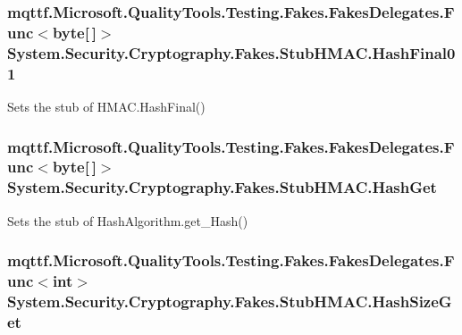 \hypertarget{class_system_1_1_security_1_1_cryptography_1_1_fakes_1_1_stub_h_m_a_c_adf1b2e12b0d5e1285e25241c6e3b28b3}{
\subsubsection[{Hash\-Final01}]{\setlength{\rightskip}{0pt plus 5cm}mqttf.\-Microsoft.\-Quality\-Tools.\-Testing.\-Fakes.\-Fakes\-Delegates.\-Func$<$byte\mbox{[}$\,$\mbox{]}$>$ System.\-Security.\-Cryptography.\-Fakes.\-Stub\-H\-M\-A\-C.\-Hash\-Final01}}\label{class_system_1_1_security_1_1_cryptography_1_1_fakes_1_1_stub_h_m_a_c_adf1b2e12b0d5e1285e25241c6e3b28b3}


Sets the stub of H\-M\-A\-C.\-Hash\-Final()

\hypertarget{class_system_1_1_security_1_1_cryptography_1_1_fakes_1_1_stub_h_m_a_c_aa15cb8a04dc40f3ab59d8beb2ae68a93}{
\subsubsection[{Hash\-Get}]{\setlength{\rightskip}{0pt plus 5cm}mqttf.\-Microsoft.\-Quality\-Tools.\-Testing.\-Fakes.\-Fakes\-Delegates.\-Func$<$byte\mbox{[}$\,$\mbox{]}$>$ System.\-Security.\-Cryptography.\-Fakes.\-Stub\-H\-M\-A\-C.\-Hash\-Get}}\label{class_system_1_1_security_1_1_cryptography_1_1_fakes_1_1_stub_h_m_a_c_aa15cb8a04dc40f3ab59d8beb2ae68a93}


Sets the stub of Hash\-Algorithm.\-get\-\_\-\-Hash()

\hypertarget{class_system_1_1_security_1_1_cryptography_1_1_fakes_1_1_stub_h_m_a_c_ad02589267222c5333b54b43fd5ccd565}{
\subsubsection[{Hash\-Size\-Get}]{\setlength{\rightskip}{0pt plus 5cm}mqttf.\-Microsoft.\-Quality\-Tools.\-Testing.\-Fakes.\-Fakes\-Delegates.\-Func$<$int$>$ System.\-Security.\-Cryptography.\-Fakes.\-Stub\-H\-M\-A\-C.\-Hash\-Size\-Get}}\label{class_system_1_1_security_1_1_cryptography_1_1_fakes_1_1_stub_h_m_a_c_ad02589267222c5333b54b43fd5ccd565}


